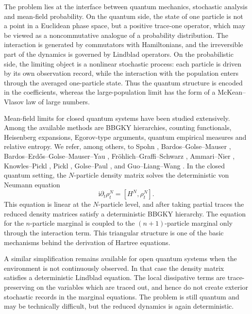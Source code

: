 \documentclass[10pt,a4paper,reqno]{amsart}
\numberwithin{equation}{section}
\theoremstyle{plain}
\theoremstyle{definition}
\theoremstyle{remark}
\renewcommand{\i}{\mathrm i}
\newcommand{\1}{\mathbf 1}
\begin{document}
The problem lies at the interface between quantum mechanics, stochastic
analysis and mean-field probability.  On the quantum side, the state of one
particle is not a point in a Euclidean phase space, but a positive trace-one
operator, which may be viewed as a noncommutative analogue of a probability
distribution.  The interaction is generated by commutators with Hamiltonians,
and the irreversible part of the dynamics is governed by Lindblad operators.
On the probabilistic side, the limiting object is a nonlinear stochastic
process: each particle is driven by its own observation record, while the
interaction with the population enters through the averaged one-particle
state.  Thus the quantum structure is encoded in the coefficients, whereas the
large-population limit has the form of a McKean--Vlasov law of large numbers.

Mean-field limits for closed quantum systems have been studied extensively.
Among the available methods are BBGKY hierarchies, counting functionals,
Heisenberg expansions, Egorov-type arguments, quantum empirical measures and
relative entropy.  We refer, among others, to Spohn \cite{spohn1980},
Bardos--Golse--Mauser \cite{bardos2000},
Bardos--Erd\H{o}s--Golse--Mauser--Yau \cite{bardos2002},
Fr\"ohlich--Graffi--Schwarz \cite{frohlich2007}, Ammari--Nier
\cite{Ammari2009}, Knowles--Pickl \cite{knowlespickl2010}, Pickl
\cite{pickl2011}, Golse--Paul \cite{golsepaul2017,golsepaul2019}, and
Guo--Liang--Wang \cite{Guo2026}.  In the closed quantum setting, the
\(N\)-particle density matrix solves the deterministic von Neumann equation
\[
  \i\partial_t\rho_t^N=[H^N,\rho_t^N].
\]
This equation is linear at the \(N\)-particle level, and after taking partial
traces the reduced density matrices satisfy a deterministic BBGKY hierarchy.
The equation for the \(n\)-particle marginal is coupled to the
\((n+1)\)-particle marginal only through the interaction term.  This triangular
structure is one of the basic mechanisms behind the derivation of Hartree
equations.

A similar simplification remains available for open quantum systems when the
environment is not continuously observed.  In that case the density matrix
satisfies a deterministic Lindblad equation.  The local dissipative
terms are trace-preserving on the variables which are traced out, and hence do
not create exterior stochastic records in the marginal equations.  The problem
is still quantum and may be technically difficult, but the reduced dynamics is
again deterministic.
\end{document}
